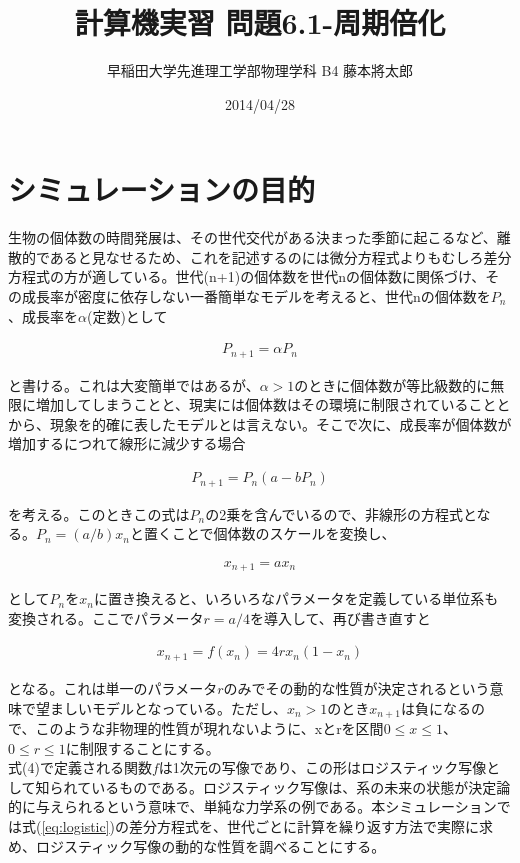 \documentclass{jsarticle}
\title{計算機実習 問題6.1-周期倍化}
\author{早稲田大学先進理工学部物理学科 B4 藤本將太郎}
\date{2014/04/28}
\begin{document}
\maketitle

\section{シミュレーションの目的}

生物の個体数の時間発展は、その世代交代がある決まった季節に起こるなど、離散的であると見なせるため、これを記述するのには微分方程式よりもむしろ差分方程式の方が適している。世代(n+1)の個体数を世代nの個体数に関係づけ、その成長率が密度に依存しない一番簡単なモデルを考えると、世代nの個体数を$P_{n}$、成長率を$\alpha$(定数)として

\begin{eqnarray}
 P_{n+1}=\alpha P_{n}
\end{eqnarray} 

と書ける。これは大変簡単ではあるが、$\alpha > 1$のときに個体数が等比級数的に無限に増加してしまうことと、現実には個体数はその環境に制限されていることとから、現象を的確に表したモデルとは言えない。そこで次に、成長率が個体数が増加するにつれて線形に減少する場合

\begin{eqnarray}
 P_{n+1}=P_{n}(a-bP_{n})
\end{eqnarray}

を考える。このときこの式は$P_{n}$の2乗を含んでいるので、非線形の方程式となる。$P_{n}=(a/b)x_{n}$と置くことで個体数のスケールを変換し、

\begin{eqnarray}
 x_{n+1}=ax_{n}
\end{eqnarray}

として$P_{n}$を$x_{n}$に置き換えると、いろいろなパラメータを定義している単位系も変換される。ここでパラメータ$r=a/4$を導入して、再び書き直すと

\begin{eqnarray}
 x_{n+1}=f(x_{n})=4rx_{n}(1-x_{n})
\label{eq:logistic}
\end{eqnarray}

となる。これは単一のパラメータ$r$のみでその動的な性質が決定されるという意味で望ましいモデルとなっている。ただし、$x_{n} > 1$のとき$x_{n+1}$は負になるので、このような非物理的性質が現れないように、xとrを区間$ 0 \leq x \leq 1 $、$ 0 \leq r \leq 1 $に制限することにする。\\
式(4)で定義される関数$f$は1次元の写像であり、この形はロジスティック写像として知られているものである。ロジスティック写像は、系の未来の状態が決定論的に与えられるという意味で、単純な力学系の例である。本シミュレーションでは式(\ref{eq:logistic})の差分方程式を、世代ごとに計算を繰り返す方法で実際に求め、ロジスティック写像の動的な性質を調べることにする。
\end{document}
